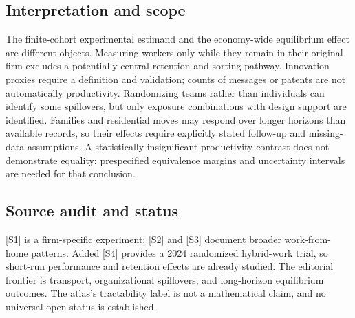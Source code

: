 \documentclass[11pt,a4paper]{article}
\begin{document}
\subsection*{Interpretation and scope}
The finite-cohort experimental estimand and the economy-wide equilibrium effect are different objects. Measuring workers only while they remain in their original firm excludes a potentially central retention and sorting pathway. Innovation proxies require a definition and validation; counts of messages or patents are not automatically productivity. Randomizing teams rather than individuals can identify some spillovers, but only exposure combinations with design support are identified. Families and residential moves may respond over longer horizons than available records, so their effects require explicitly stated follow-up and missing-data assumptions. A statistically insignificant productivity contrast does not demonstrate equality: prespecified equivalence margins and uncertainty intervals are needed for that conclusion.
\subsection*{Source audit and status}
[S1] is a firm-specific experiment; [S2] and [S3] document broader work-from-home patterns. Added [S4] provides a 2024 randomized hybrid-work trial, so short-run performance and retention effects are already studied. The editorial frontier is transport, organizational spillovers, and long-horizon equilibrium outcomes. The atlas's tractability label is not a mathematical claim, and no universal open status is established.
\end{document}
